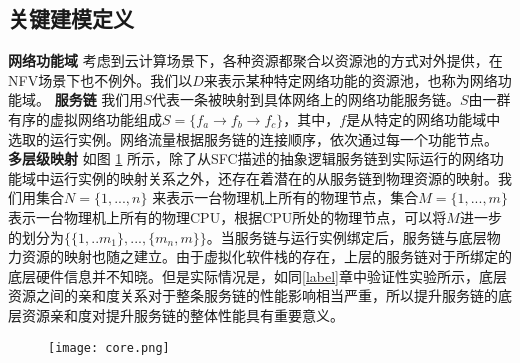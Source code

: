 \subsection{关键建模定义}
\textbf{网络功能域}{ }考虑到云计算场景下，各种资源都聚合以资源池的方式对外提供，在NFV场景下也不例外。我们以$D$来表示某种特定网络功能的资源池，也称为网络功能域。
\textbf{服务链}{ }我们用$S$代表一条被映射到具体网络上的网络功能服务链。$S$由一群有序的虚拟网络功能组成$S = \{f_{a} \to f_{b} \to f_{c}\}$，其中，$f$是从特定的网络功能域中选取的运行实例。网络流量根据服务链的连接顺序，依次通过每一个功能节点。
\textbf{多层级映射}{ }如图 \ref{fig:mapping} 所示，除了从SFC描述的抽象逻辑服务链到实际运行的网络功能域中运行实例的映射关系之外，还存在着潜在的从服务链到物理资源的映射。我们用集合$N = \{1,...,n\}$ 来表示一台物理机上所有的物理节点，集合$M = \{1,...,m\}$表示一台物理机上所有的物理CPU，根据CPU所处的物理节点，可以将$M$进一步的划分为$ \{\{1,..m_{1}\},...,\{m_{n},m\}\}$。当服务链与运行实例绑定后，服务链与底层物力资源的映射也随之建立。由于虚拟化软件栈的存在，上层的服务链对于所绑定的底层硬件信息并不知晓。但是实际情况是，如同\ref{label}章中验证性实验所示，底层资源之间的亲和度关系对于整条服务链的性能影响相当严重，所以提升服务链的底层资源亲和度对提升服务链的整体性能具有重要意义。
\begin{figure}[!htp]
	\label{fig:mapping}
	\centering
	\texttt{[image: core.png]}
\end{figure}

